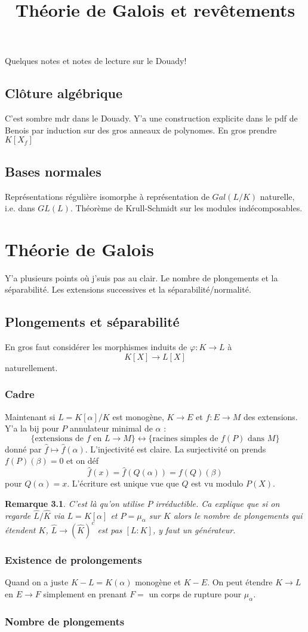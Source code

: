 \documentclass[a4paper,12pt]{book}
\title{Théorie de Galois et revêtements}
\date{}
\theoremstyle{plain}
\newtheorem{rem}{Remarque}
\theoremstyle{definition}
\theoremstyle{remark}
\begin{document}
\maketitle
\tableofcontents
Quelques notes et notes de lecture sur le Douady!

\section{Clôture algébrique}
C'est sombre mdr dans le Douady. Y'a une construction explicite
dans le pdf de Benois par induction sur des gros anneaux de 
polynomes. En gros prendre $K[X_f]$


\section{Bases normales}
Représentations régulière isomorphe à
représentation de $Gal(L/K)$ naturelle,
i.e. dans $GL(L)$. Théorème de Krull-Schmidt
sur les modules indécomposables.

\chapter{Théorie de Galois}
Y'a plusieurs points où j'suis pas au clair. Le
nombre de plongements et la séparabilité. Les
extensions successives et la séparabilité/normalité.

\section{Plongements et séparabilité}
En gros faut considérer les morphismes
induits de $\varphi\colon K\to L$ à
\[K[X]\to L[X]\]
naturellement.
\subsection{Cadre}
Maintenant si $L=K[\alpha]/K$ est monogène,
$K\to E$ et $f\colon E\to M$ des extensions. Y'a la bij pour $P$
annulateur minimal de $\alpha$ :
\[\{\textrm{extensions de $f$ en $L\to M$}\}\leftrightarrow
\{\textrm{racines simples de $f(P)$ dans $M$}\}\]
donné par $\hat f\mapsto \hat f(\alpha)$. L'injectivité
est claire. La surjectivité on prends $f(P)(\beta)=0$ et on
déf \[\hat f(x)=\hat f(Q(\alpha))= f(Q)(\beta)\]
pour $Q(\alpha)=x$. L'écriture est unique vue que $Q$ est vu modulo
$P(X)$. 
\begin{rem}
  C'est là qu'on utilise $P$ irréductible. Ca explique que
  si on regarde $\hat L/\hat K$ via $L=K[\alpha]$ et $P=\mu_\alpha$
  sur $K$ alors le nombre de plongements qui étendent $K$,
  $\hat L\to (\hat K)^c$ est pas $[L:K]$, y faut un générateur.
\end{rem}
\subsection{Existence de prolongements}
Quand on a juste $K-L=K(\alpha)$ monogène et $K-E$. On peut étendre
$K\to L$ en $E\to F$ simplement en prenant $F=$ un corps de
rupture pour $\mu_\alpha$.

\subsection{Nombre de plongements}






\printbibliography
\end{document}
